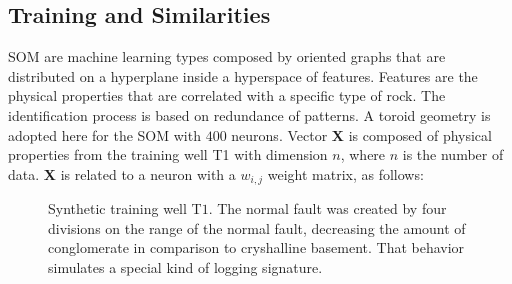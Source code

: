 \documentclass{cph18}
\begin{document}
\subsection{Training and Similarities}

SOM are machine learning types composed by oriented graphs that are distributed on a hyperplane inside a hyperspace of features.  Features are the physical properties that are correlated with a specific type of rock. The identification process is based on redundance of patterns. A toroid geometry is adopted here for the SOM with $400$ neurons.  Vector \textbf{X} is composed of physical properties from the training well T1 with dimension $n$, where $n$ is the number of data. \textbf{X} is related to a neuron with a $w_{i,j}$ weight matrix, as follows:    

\begin{figure}[H]
	\centering
	\setlength{\fboxsep}{8pt}
	\setlength{\fboxrule}{0.1pt}
	\caption{Synthetic training well T$1$. The normal fault was created by four divisions on the range of the normal fault, decreasing the amount of conglomerate in comparison to cryshalline basement. That behavior simulates a special kind of logging signature. }
	\label{C3}
\end{figure}



\end{document}
